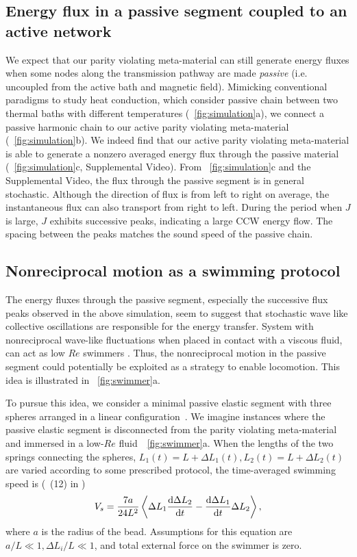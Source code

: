 \documentclass[
 preprint,
 preprintnumbers,
 amsmath,amssymb,
 aps,
 pre,
 longbibliography,
 superscriptaddress,
 10pt, twocolumn
]{revtex4-1}
\begin{document}
\subsection{Energy flux in a passive segment coupled to an active network}
We expect that our parity violating meta-material can still generate energy fluxes when some nodes along the transmission pathway are made {\it passive} (i.e. uncoupled from the active bath and magnetic field).
Mimicking conventional paradigms to study heat conduction, which consider passive chain between two thermal baths with different temperatures (\figurename~\ref{fig:simulation}a), we connect a passive harmonic chain to our active parity violating meta-material (\figurename~\ref{fig:simulation}b).
We indeed find that our active parity violating meta-material is able to generate a nonzero averaged energy flux through the passive material (\figurename~\ref{fig:simulation}c, Supplemental Video).
From \figurename~\ref{fig:simulation}c and the Supplemental Video, the flux through the passive segment is in general stochastic. Although the direction of flux is from left to right on average, the instantaneous flux can also transport from right to left. During the period when $J$ is large, $J$ exhibits successive peaks, indicating a large CCW energy flow. The spacing between the peaks matches the sound speed of the passive chain.


\subsection{Nonreciprocal motion as a swimming protocol}
The energy fluxes through the passive segment, especially the successive flux peaks observed in the above simulation, seem to suggest that stochastic wave like collective oscillations are responsible for the energy transfer. System with nonreciprocal wave-like fluctuations when placed in contact with a viscous fluid, can act as low $Re$ swimmers \cite{Taylor1951AnalysisSwimming,Purcell1977LifeLow,Golestanian2008AnalyticResults}. Thus, the nonreciprocal motion in the passive segment could potentially be exploited as a strategy to enable locomotion. This idea is illustrated in \figurename~\ref{fig:swimmer}a.

To pursue this idea, we consider a minimal passive elastic segment with three spheres arranged in a linear configuration~\cite{Golestanian2008AnalyticResults}. We imagine instances where the passive elastic segment is disconnected from the parity violating meta-material and immersed in a low-$Re$ fluid~\figurename~\ref{fig:swimmer}a. When the lengths of the two springs connecting the spheres, $L_1(t) = L+\Delta L_1(t), L_2(t) = L+\Delta L_2(t)$ are varied according to some prescribed protocol, the time-averaged swimming speed is (\eqnname~(12) in \cite{Golestanian2008AnalyticResults})
\begin{equation} \label{eqn:swimmer_speed}
    V_s = \frac{7a}{24L^2} \expval{\Delta L_1 \dv{\Delta L_2}{t} - \dv{\Delta L_1}{t} \Delta{L_2}},
\end{equation}
where $a$ is the radius of the bead. Assumptions for this equation are $a/L \ll 1, \Delta L_i/L \ll 1$, and total external force on the swimmer is zero.
\end{document}
